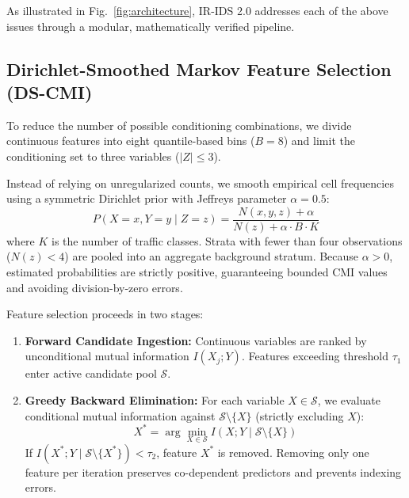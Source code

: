 \documentclass[10pt,journal,compsoc]{IEEEtran}
\begin{document}
As illustrated in Fig.~\ref{fig:architecture}, IR-IDS 2.0 addresses each of the above issues through a modular, mathematically verified pipeline.

\subsection{Dirichlet-Smoothed Markov Feature Selection (DS-CMI)}
To reduce the number of possible conditioning combinations, we divide continuous features into eight quantile-based bins ($B = 8$) and limit the conditioning set to three variables ($|Z| \le 3$). 

Instead of relying on unregularized counts, we smooth empirical cell frequencies using a symmetric Dirichlet prior with Jeffreys parameter $\alpha = 0.5$:
\begin{equation}
P(X=x, Y=y \mid Z=z) = \frac{N(x, y, z) + \alpha}{N(z) + \alpha \cdot B \cdot K}
\end{equation}
where $K$ is the number of traffic classes. Strata with fewer than four observations ($N(z) < 4$) are pooled into an aggregate background stratum. Because $\alpha > 0$, estimated probabilities are strictly positive, guaranteeing bounded CMI values and avoiding division-by-zero errors.

Feature selection proceeds in two stages:
\begin{enumerate}
    \item \textbf{Forward Candidate Ingestion:} Continuous variables are ranked by unconditional mutual information $I(X_j; Y)$. Features exceeding threshold $\tau_1$ enter active candidate pool $\mathcal{S}$.
    \item \textbf{Greedy Backward Elimination:} For each variable $X \in \mathcal{S}$, we evaluate conditional mutual information against $\mathcal{S} \setminus \{X\}$ (strictly excluding $X$):
    \begin{equation}
    X^* = \arg\min_{X \in \mathcal{S}} I(X; Y \mid \mathcal{S} \setminus \{X\})
    \end{equation}
    If $I(X^*; Y \mid \mathcal{S} \setminus \{X^*\}) < \tau_2$, feature $X^*$ is removed. Removing only one feature per iteration preserves co-dependent predictors and prevents indexing errors.
\end{enumerate}
\end{document}
